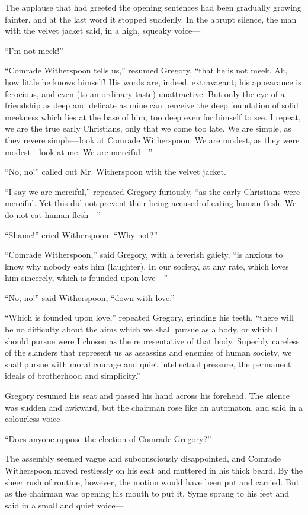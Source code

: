 The applause that had greeted the opening sentences had been gradually growing fainter, and at the last word it stopped suddenly. In the abrupt silence, the man with the velvet jacket said, in a high, squeaky voice⁠—

“I’m not meek!”

“Comrade Witherspoon tells us,” resumed Gregory, “that he is not meek. Ah, how little he knows himself! His words are, indeed, extravagant; his appearance is ferocious, and even (to an ordinary taste) unattractive. But only the eye of a friendship as deep and delicate as mine can perceive the deep foundation of solid meekness which lies at the base of him, too deep even for himself to see. I repeat, we are the true early Christians, only that we come too late. We are simple, as they revere simple⁠—look at Comrade Witherspoon. We are modest, as they were modest⁠—look at me. We are merciful⁠—”

“No, no!” called out Mr. Witherspoon with the velvet jacket.

“I say we are merciful,” repeated Gregory furiously, “as the early Christians were merciful. Yet this did not prevent their being accused of eating human flesh. We do not eat human flesh⁠—”

“Shame!” cried Witherspoon. “Why not?”

“Comrade Witherspoon,” said Gregory, with a feverish gaiety, “is anxious to know why nobody eats him (laughter). In our society, at any rate, which loves him sincerely, which is founded upon love⁠—”

“No, no!” said Witherspoon, “down with love.”

“Which is founded upon love,” repeated Gregory, grinding his teeth, “there will be no difficulty about the aims which we shall pursue as a body, or which I should pursue were I chosen as the representative of that body. Superbly careless of the slanders that represent us as assassins and enemies of human society, we shall pursue with moral courage and quiet intellectual pressure, the permanent ideals of brotherhood and simplicity.”

Gregory resumed his seat and passed his hand across his forehead. The silence was sudden and awkward, but the chairman rose like an automaton, and said in a colourless voice⁠—

“Does anyone oppose the election of Comrade Gregory?”

The assembly seemed vague and subconsciously disappointed, and Comrade Witherspoon moved restlessly on his seat and muttered in his thick beard. By the sheer rush of routine, however, the motion would have been put and carried. But as the chairman was opening his mouth to put it, Syme sprang to his feet and said in a small and quiet voice⁠—

